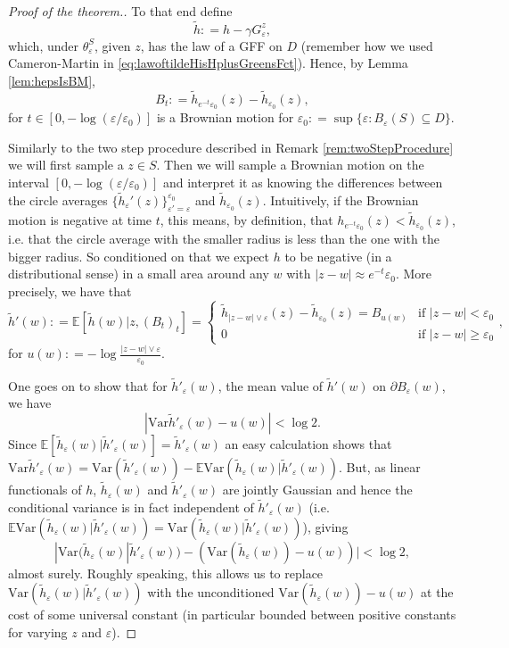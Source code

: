 \documentclass[11pt,reqno]{amsart}
\numberwithin{equation}{section}
\newcommand{\deq}{\mathrel{\mathop:}=}
\newcommand{\eps}{\varepsilon}
\begin{document}
\begin{proof}[Proof of the theorem.]
	To that end define $$\tilde h\deq h-\gamma G_\eps^z,$$ which, under $\theta_\eps^S$, given $z$, has the law of a GFF on $D$ (remember how we used Cameron-Martin in \eqref{eq:lawoftildeHisHplusGreensFct}).
	Hence, by Lemma \ref{lem:hepsIsBM}, $$B_t\deq\tilde h_{e^{-t}\eps_0}(z)-\tilde h_{\eps_0}(z),$$ for $t\in[0,-\log(\eps/\eps_0)]$ is a Brownian motion for $\eps_0\deq \sup\{\eps:B_\eps(S)\subseteq D\}$.
	
	Similarly to the two step procedure described in Remark \ref{rem:twoStepProcedure} we will first sample a $z\in S$. Then we will sample a Brownian motion on the interval $[0,-\log(\eps/\eps_0)]$ and interpret it as knowing the differences between the circle averages $\{\tilde h_\eps'(z)\}_{\eps'=\eps}^{\eps_0}$ and $\tilde h_{\eps_0}(z)$. Intuitively, if the Brownian motion is negative at time $t$, this means, by definition, that $h_{e^{-t}\eps_0}(z)<\tilde h_{\eps_0}(z)$, i.e. that the circle average with the smaller radius is less than the one with the bigger radius. So conditioned on that we expect $h$ to be negative (in a distributional sense) in a small area around any $w$ with $|z-w|\approx e^{-t}\eps_0$.
	More precisely, we have that $$\tilde h'(w)\deq\mathbb E[\tilde h(w)|z,(B_t)_t]=\begin{cases}
			\tilde h_{|z-w|\vee\eps}(z)-\tilde h_{\eps_0}(z)=B_{u(w)} &\text{if } |z-w|<\eps_0\\
			0 &\text{if } |z-w|\geq\eps_0
		\end{cases},$$
		for $u(w)\deq -\log\frac{|z-w|\vee\eps}{\eps_0}$.
	
	One goes on to show that for $\tilde h'_\eps(w)$, the mean value of $\tilde h'(w)$ on $\partial B_\eps(w)$, we have $$|\text{Var} \tilde h'_\eps(w)-u(w)|<\log 2.$$ Since $\mathbb E[\tilde h_\eps(w)|\tilde h'_\eps(w)]=\tilde h'_\eps(w)$ an easy calculation shows that $\text{Var}\tilde h'_\eps(w) = \text{Var}(\tilde h'_\eps(w))-\mathbb E\text{Var}(\tilde h_\eps(w)|\tilde h'_\eps(w))$. But, as linear functionals of $h$, $\tilde h_\eps(w)$ and $\tilde h'_\eps(w)$ are jointly Gaussian and hence the conditional variance is in fact independent of $\tilde h'_\eps(w)$ (i.e. $\mathbb E\text{Var}(\tilde h_\eps(w)|\tilde h'_\eps(w)) = \text{Var}(\tilde h_\eps(w)|\tilde h'_\eps(w))$), giving
	$$|\text{Var}(\tilde h_\eps(w)|\tilde h'_\eps(w))-(\text{Var}(\tilde h_\eps(w))-u(w))|<\log 2,$$ almost surely. Roughly speaking, this allows us to replace $\text{Var}(\tilde h_\eps(w)|\tilde h'_\eps(w))$ with the unconditioned $\text{Var}(\tilde h_\eps(w))-u(w)$ at the cost of some universal constant (in particular bounded between positive constants for varying $z$ and $\eps$).
	

\end{proof}
\end{document}
